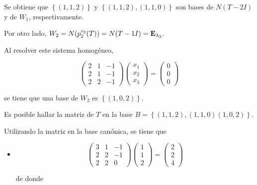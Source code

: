 \begin{example}
 \bigskip
 
Se obtiene que $\left\{(1,1,2)\right\} $  y  $\left\{(1,1,2),(1,1,0)\right\}$  son  bases de $N(T-2I)$ y de $W_1$, respectivamente.

\bigskip
Por otro lado, $W_2=N(p_2^{r_2}(T))=N(T-1I)=\bold{E}_{\lambda_3}$. 

\bigskip

Al resolver este sistema homogéneo,

$$\left(\begin{array}{ccc} 2 & 1 &  -1 \\ 2 & 1 & -1
\\ 2 & 2 & -1
\end{array}
 \right)  \left(\begin{array}{c} x_1\\ x_2
\\ x_3
\end{array}
 \right) =  \left(\begin{array}{c} 0\\ 0
\\ 0
\end{array}
 \right)$$ 

\bigskip
\noindent
 se tiene que una base de $W_2$ es $\left\{(1,0,2)\right\}$.

\bigskip

Es posible hallar  la matriz de $T$ en la base $B=\left\{ (1,1,2),(1,1,0)(1,0,2)\right\}$. 


\bigskip

Utilizando la matriz en la base canónica, se tiene que  

 \bigskip

\begin{itemize}
    \item
$$\left(\begin{array}{ccc} 3 & 1 &  -1 \\ 2 & 2 & -1
\\ 2 & 2 & 0
\end{array}
 \right)  \left(\begin{array}{c} 1\\ 1
\\ 2
\end{array}
 \right) =  \left(\begin{array}{c} 2\\ 2
\\ 4
\end{array}
 \right)$$ 
 
 \bigskip
 
\noindent
de donde   
    

\end{itemize}
\end{example}
